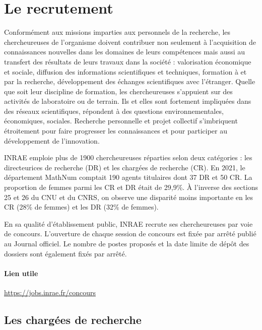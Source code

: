 \section{ Le recrutement}
Conform\'ement aux missions imparties aux personnels de la recherche, les chercheur\mp euse\mp s de l'organisme doivent contribuer non seulement \`a l'acquisition de connaissances nouvelles dans les domaines de leurs comp\'etences mais aussi au transfert des r\'esultats de leurs travaux dans la soci\'et\'e : valorisation \'economique et sociale, diffusion des informations scientifiques et techniques, formation \`a et par la recherche, d\'eveloppement des \'echanges scientifiques avec l'\'etranger. 
Quelle que soit leur discipline de formation, les chercheur\mp euse\mp s s'appuient sur des activit\'es de laboratoire ou de \og terrain\fg{}. Ils et elles sont fortement impliqu\'e\mp e\mp s dans des r\'eseaux scientifiques, r\'epondent \`a des questions environnementales, \'economiques, sociales. Recherche personnelle et projet collectif s'imbriquent \'etroitement pour faire progresser les connaissances et pour participer au d\'eveloppement de l'innovation.

INRAE emploie plus de 1900 chercheur\mp euse\mp s  r\'eparti\mp e\mp s selon deux cat\'egories : les directeur\mp ice\mp s de recherche (DR) et les charg\'e\mp e\mp s de recherche (CR). %
En 2021, le d\'epartement MathNum comptait 190 agents titulaires dont 37 DR et 50 CR. La proportion de femmes parmi les CR et DR \'etait de 29,9\%. \`A l'inverse des sections 25 et 26 du CNU et du CNRS, on observe une disparit\'e moins importante en les CR (28\% de femmes) et les DR (32\% de femmes).

En sa qualit\'e d'\'etablissement public, INRAE recrute ses chercheur\mp euse\mp s par voie de concours. L'ouverture de chaque session de concours est fix\'ee par arr\^et\'e publi\'e au Journal officiel. Le nombre de postes propos\'es et la date limite de d\'ep\^ot des dossiers sont \'egalement fix\'es par arr\^et\'e.

\vspace{-.5\baselineskip}
\paragraph*{Lien utile} \url{https://jobs.inrae.fr/concours}

\subsection{ Les charg\'e\mp e\mp s de recherche}

